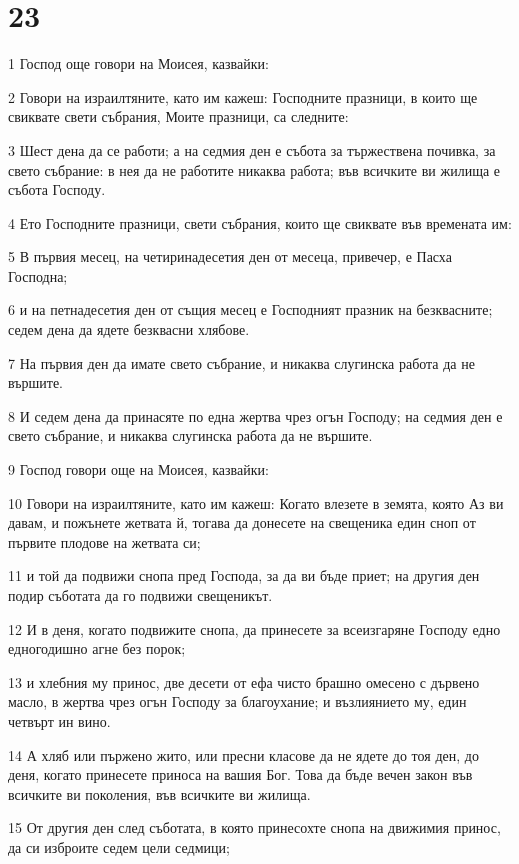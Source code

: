 \chapter{23}

\par 1 Господ още говори на Моисея, казвайки:
\par 2 Говори на израилтяните, като им кажеш: Господните празници, в които ще свиквате свети събрания, Моите празници, са следните:
\par 3 Шест дена да се работи; а на седмия ден е събота за тържествена почивка, за свето събрание: в нея да не работите никаква работа; във всичките ви жилища е събота Господу.
\par 4 Ето Господните празници, свети събрания, които ще свиквате във времената им:
\par 5 В първия месец, на четиринадесетия ден от месеца, привечер, е Пасха Господна;
\par 6 и на петнадесетия ден от същия месец е Господният празник на безквасните; седем дена да ядете безквасни хлябове.
\par 7 На първия ден да имате свето събрание, и никаква слугинска работа да не вършите.
\par 8 И седем дена да принасяте по една жертва чрез огън Господу; на седмия ден е свето събрание, и никаква слугинска работа да не вършите.
\par 9 Господ говори още на Моисея, казвайки:
\par 10 Говори на израилтяните, като им кажеш: Когато влезете в земята, която Аз ви давам, и пожънете жетвата й, тогава да донесете на свещеника един сноп от първите плодове на жетвата си;
\par 11 и той да подвижи снопа пред Господа, за да ви бъде приет; на другия ден подир съботата да го подвижи свещеникът.
\par 12 И в деня, когато подвижите снопа, да принесете за всеизгаряне Господу едно едногодишно агне без порок;
\par 13 и хлебния му принос, две десети от ефа чисто брашно омесено с дървено масло, в жертва чрез огън Господу за благоухание; и възлиянието му, един четвърт ин вино.
\par 14 А хляб или пържено жито, или пресни класове да не ядете до тоя ден, до деня, когато принесете приноса на вашия Бог. Това да бъде вечен закон във всичките ви поколения, във всичките ви жилища.
\par 15 От другия ден след съботата, в която принесохте снопа на движимия принос, да си изброите седем цели седмици;
